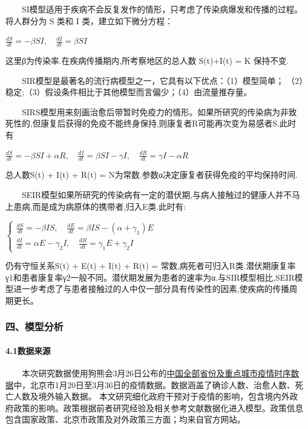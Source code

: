 \documentclass[12pt,a5paper,]{article}
\let\oldparagraph\paragraph
\renewcommand{\paragraph}[1]{\oldparagraph{#1}\mbox{}}
\begin{document}
  SI模型适用于疾病不会反复发作的情形，只考虑了传染病爆发和传播的过程。将人群分为
S 类和 I 类，建立如下微分方程：

\(\frac{d S}{d t}=-\beta S I, \quad \frac{d I}{d t}=\beta S I\)

这里β为传染率.在疾病传播期内,所考察地区的总人数 S(t)+I(t) = K 保持不变.

  SIR模型是最著名的流行病模型之一，它具有以下优点：（1）模型简单；
（2）稳定;（3）假设条件相比于其他模型而言偏少；（4）由流量推存量。

  SIRS模型用来刻画治愈后带暂时免疫力的情形。如果所研究的传染病为非致死性的,但康复后获得的免疫不能终身保持,则康复者R可能再次变为易感者S.此时有

\(\frac{d S}{d t}=-\beta S I+\alpha R, \quad \frac{d I}{d t}=\beta S I-\gamma I, \quad \frac{d R}{d t}=\gamma I-\alpha R\)

总人数S(t) + I(t) + R(t) =
N为常数.参数α决定康复者获得免疫的平均保持时间.

  SEIR模型如果所研究的传染病有一定的潜伏期,与病人接触过的健康人并不马上患病,而是成为病原体的携带者,归入E类.此时有:

\(\left\{\begin{array}{l}\frac{d S}{d t}=-\beta I S, \quad \frac{d E}{d t}=\beta I S-\left(\alpha+\gamma_{1}\right) E \\ \frac{d I}{d t}=\alpha E-\gamma_{2} I, \quad \frac{d R}{d t}=\gamma_{1} E+\gamma_{2} I\end{array}\right.\)

仍有守恒关系S(t) + E(t) + I(t) + R(t) =
常数,病死者可归入R类.潜伏期康复率γ1和患者康复率γ2一般不同。潜伏期发展为患者的速率为α.与SIR模型相比,SEIR模型进一步考虑了与患者接触过的人中仅一部分具有传染性的因素,使疾病的传播周期更长。

\hypertarget{ux56dbux6a21ux578bux5206ux6790}{%
\subsubsection{四、模型分析}\label{ux56dbux6a21ux578bux5206ux6790}}

\hypertarget{ux6570ux636eux6765ux6e90}{%
\paragraph{4.1数据来源}\label{ux6570ux636eux6765ux6e90}}

  本次研究数据使用狗熊会3月26日公布的\href{https://mp.weixin.qq.com/s/w4t7htltf6XzZEgQrxVLiQ}{中国全部省份及重点城市疫情时序数据}中，北京市1月20日至3月36日的疫情数据。数据涵盖了确诊人数、治愈人数、死亡人数及境外输入数据。
本文研究细化政府干预对于疫情的影响，包含境内外政府政策的影响。政策根据前者研究经验及相关参考文献数据化进入模型。政策信息包含国家政策、北京市政策及对外政策三方面；均来自官方网站。
\end{document}
